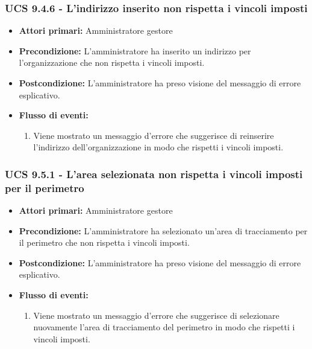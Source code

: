 \subsubsection{UCS 9.4.6 - L'indirizzo inserito non rispetta i vincoli imposti}%
\begin{itemize}
\item \textbf{Attori primari:} Amministratore gestore
\item \textbf{Precondizione:} L'amministratore ha inserito un indirizzo per l'organizzazione che non rispetta i vincoli imposti.
\item \textbf{Postcondizione:} L'amministratore ha preso visione del messaggio di errore esplicativo.
\item \textbf{Flusso di eventi:}
    \begin{enumerate}
    \item Viene mostrato un messaggio d'errore che suggerisce di reinserire l'indirizzo dell'organizzazione in modo che rispetti i vincoli imposti.
    \end{enumerate} 
\end{itemize}

\subsubsection{UCS 9.5.1 - L'area selezionata non rispetta i vincoli imposti per il perimetro}%
\begin{itemize}
\item \textbf{Attori primari:} Amministratore gestore
\item \textbf{Precondizione:} L'amministratore ha selezionato un'area di tracciamento per il perimetro che non rispetta i vincoli imposti.
\item \textbf{Postcondizione:} L'amministratore ha preso visione del messaggio di errore esplicativo.
\item \textbf{Flusso di eventi:}
    \begin{enumerate}
    \item Viene mostrato un messaggio d'errore che suggerisce di selezionare nuovamente l'area di tracciamento del perimetro in modo che rispetti i vincoli imposti.
    \end{enumerate} 
\end{itemize}

